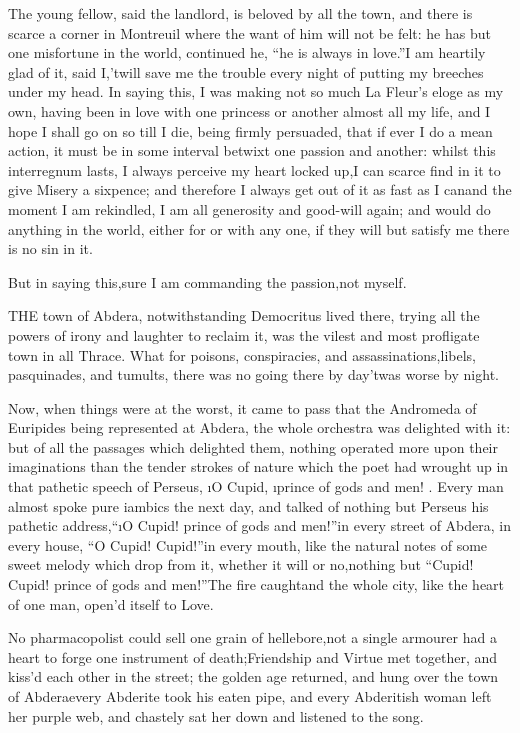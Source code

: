 \documentclass[twoside]{article}
\begin{document}
\tsk The young fellow, said the landlord, is beloved by all the town, and
there is scarce a corner in Montreuil where the want of him will not be
felt: he has but one misfortune in the world, continued he, “he is always
in love.”\tsk I am heartily glad of it, said I,\tsk ’twill save me the trouble
every night of putting my breeches under my head.  In saying this, I was
making not so much La Fleur’s eloge as my own, having been in love with
one princess or another almost all my life, and I hope I shall go on so
till I die, being firmly persuaded, that if ever I do a mean action, it
must be in some interval betwixt one passion and another: whilst this
interregnum lasts, I always perceive my heart locked up,\tsk I can scarce
find in it to give Misery a sixpence; and therefore I always get out of
it as fast as I can\tsk and the moment I am rekindled, I am all generosity
and good-will again; and would do anything in the world, either for or
with any one, if they will but satisfy me there is no sin in it.

\tsk But in saying this,\tsk sure I am commanding the passion,\tsk not myself.






\tsk THE town of Abdera, notwithstanding Democritus lived there, trying all
the powers of irony and laughter to reclaim it, was the vilest and most
profligate town in all Thrace.  What for poisons, conspiracies, and
assassinations,\tsk libels, pasquinades, and tumults, there was no going
there by day\tsk ’twas worse by night.

Now, when things were at the worst, it came to pass that the Andromeda of
Euripides being represented at Abdera, the whole orchestra was delighted
with it: but of all the passages which delighted them, nothing operated
more upon their imaginations than the tender strokes of nature which the
poet had wrought up in that pathetic speech of Perseus, \i{O Cupid},
\i{prince of gods and men}! \etc.  Every man almost spoke pure iambics the
next day, and talked of nothing but Perseus his pathetic address,\tsk “\i{O
Cupid! prince of gods and men}!”\tsk in every street of Abdera, in every
house, “O Cupid!  Cupid!”\tsk in every mouth, like the natural notes of some
sweet melody which drop from it, whether it will or no,\tsk nothing but
“Cupid! Cupid! prince of gods and men!”\tsk The fire caught\tsk and the whole
city, like the heart of one man, open’d itself to Love.

No pharmacopolist could sell one grain of hellebore,\tsk not a single
armourer had a heart to forge one instrument of death;\tsk Friendship and
Virtue met together, and kiss’d each other in the street; the golden age
returned, and hung over the town of Abdera\tsk every Abderite took his eaten
pipe, and every Abderitish woman left her purple web, and chastely sat
her down and listened to the song.
\end{document}
